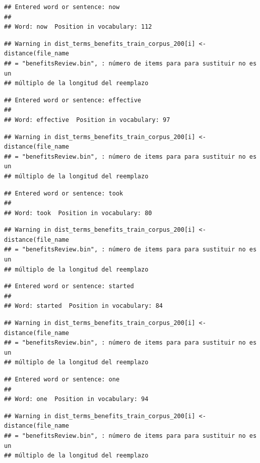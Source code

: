 \documentclass[spanish,]{article}
\begin{document}
\begin{verbatim}
## Entered word or sentence: now
## 
## Word: now  Position in vocabulary: 112
\end{verbatim}

\begin{verbatim}
## Warning in dist_terms_benefits_train_corpus_200[i] <- distance(file_name
## = "benefitsReview.bin", : número de items para para sustituir no es un
## múltiplo de la longitud del reemplazo
\end{verbatim}

\begin{verbatim}
## Entered word or sentence: effective
## 
## Word: effective  Position in vocabulary: 97
\end{verbatim}

\begin{verbatim}
## Warning in dist_terms_benefits_train_corpus_200[i] <- distance(file_name
## = "benefitsReview.bin", : número de items para para sustituir no es un
## múltiplo de la longitud del reemplazo
\end{verbatim}

\begin{verbatim}
## Entered word or sentence: took
## 
## Word: took  Position in vocabulary: 80
\end{verbatim}

\begin{verbatim}
## Warning in dist_terms_benefits_train_corpus_200[i] <- distance(file_name
## = "benefitsReview.bin", : número de items para para sustituir no es un
## múltiplo de la longitud del reemplazo
\end{verbatim}

\begin{verbatim}
## Entered word or sentence: started
## 
## Word: started  Position in vocabulary: 84
\end{verbatim}

\begin{verbatim}
## Warning in dist_terms_benefits_train_corpus_200[i] <- distance(file_name
## = "benefitsReview.bin", : número de items para para sustituir no es un
## múltiplo de la longitud del reemplazo
\end{verbatim}

\begin{verbatim}
## Entered word or sentence: one
## 
## Word: one  Position in vocabulary: 94
\end{verbatim}

\begin{verbatim}
## Warning in dist_terms_benefits_train_corpus_200[i] <- distance(file_name
## = "benefitsReview.bin", : número de items para para sustituir no es un
## múltiplo de la longitud del reemplazo
\end{verbatim}
\end{document}
